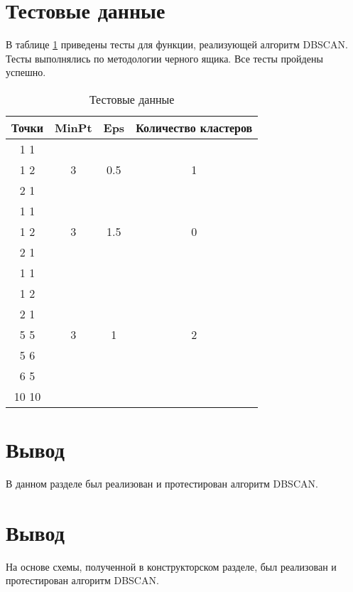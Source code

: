\section{Тестовые данные}

В таблице \ref{tbl:test} приведены тесты для функции, реализующей алгоритм DBSCAN.
Тесты выполнялись по методологии черного ящика.
Все тесты пройдены успешно.

\begin{table}[H]
	\begin{center}
		\caption{\label{tbl:test}Тестовые данные}
		\begin{tabular}{|c|c|c|c|}
			\hline
			\bfseries Точки & \bfseries MinPt & \bfseries Eps & \bfseries Количество кластеров  \\ 
			\hline

			1 1 & \multirow{3}{*}{3} & \multirow{3}{*}{0.5} & \multirow{3}{*}{1} \\
			1 2 & & & \\
			2 1 & & & \\ \hline

			1 1 & \multirow{3}{*}{3} & \multirow{3}{*}{1.5} & \multirow{3}{*}{0} \\
			1 2 & & & \\
			2 1 & & & \\ \hline

			1 1 & \multirow{7}{*}{3} & \multirow{7}{*}{1} & \multirow{7}{*}{2} \\
			1 2 & & & \\
			2 1 & & & \\
			5 5 & & & \\
			5 6 & & & \\
			6 5 & & & \\
			10 10 & & & \\ \hline

		\end{tabular}
	\end{center}
\end{table}

\section*{Вывод}

В данном разделе был реализован и протестирован алгоритм DBSCAN.

\section*{Вывод}

На основе схемы, полученной в конструкторском разделе, был реализован и протестирован алгоритм DBSCAN.
